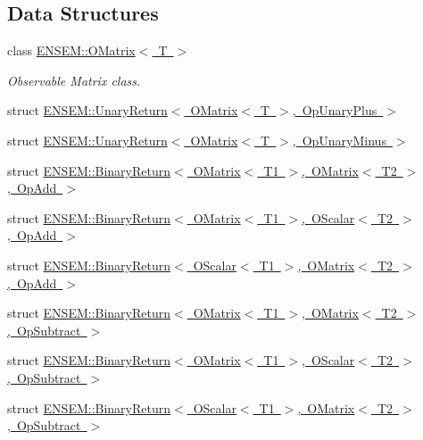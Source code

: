 \subsection*{Data Structures}
\begin{DoxyCompactItemize}
\item 
class \mbox{\hyperlink{classENSEM_1_1OMatrix}{E\+N\+S\+E\+M\+::\+O\+Matrix$<$ T $>$}}
\begin{DoxyCompactList}\small\item\em Observable Matrix class. \end{DoxyCompactList}\item 
struct \mbox{\hyperlink{structENSEM_1_1UnaryReturn_3_01OMatrix_3_01T_01_4_00_01OpUnaryPlus_01_4}{E\+N\+S\+E\+M\+::\+Unary\+Return$<$ O\+Matrix$<$ T $>$, Op\+Unary\+Plus $>$}}
\item 
struct \mbox{\hyperlink{structENSEM_1_1UnaryReturn_3_01OMatrix_3_01T_01_4_00_01OpUnaryMinus_01_4}{E\+N\+S\+E\+M\+::\+Unary\+Return$<$ O\+Matrix$<$ T $>$, Op\+Unary\+Minus $>$}}
\item 
struct \mbox{\hyperlink{structENSEM_1_1BinaryReturn_3_01OMatrix_3_01T1_01_4_00_01OMatrix_3_01T2_01_4_00_01OpAdd_01_4}{E\+N\+S\+E\+M\+::\+Binary\+Return$<$ O\+Matrix$<$ T1 $>$, O\+Matrix$<$ T2 $>$, Op\+Add $>$}}
\item 
struct \mbox{\hyperlink{structENSEM_1_1BinaryReturn_3_01OMatrix_3_01T1_01_4_00_01OScalar_3_01T2_01_4_00_01OpAdd_01_4}{E\+N\+S\+E\+M\+::\+Binary\+Return$<$ O\+Matrix$<$ T1 $>$, O\+Scalar$<$ T2 $>$, Op\+Add $>$}}
\item 
struct \mbox{\hyperlink{structENSEM_1_1BinaryReturn_3_01OScalar_3_01T1_01_4_00_01OMatrix_3_01T2_01_4_00_01OpAdd_01_4}{E\+N\+S\+E\+M\+::\+Binary\+Return$<$ O\+Scalar$<$ T1 $>$, O\+Matrix$<$ T2 $>$, Op\+Add $>$}}
\item 
struct \mbox{\hyperlink{structENSEM_1_1BinaryReturn_3_01OMatrix_3_01T1_01_4_00_01OMatrix_3_01T2_01_4_00_01OpSubtract_01_4}{E\+N\+S\+E\+M\+::\+Binary\+Return$<$ O\+Matrix$<$ T1 $>$, O\+Matrix$<$ T2 $>$, Op\+Subtract $>$}}
\item 
struct \mbox{\hyperlink{structENSEM_1_1BinaryReturn_3_01OMatrix_3_01T1_01_4_00_01OScalar_3_01T2_01_4_00_01OpSubtract_01_4}{E\+N\+S\+E\+M\+::\+Binary\+Return$<$ O\+Matrix$<$ T1 $>$, O\+Scalar$<$ T2 $>$, Op\+Subtract $>$}}
\item 
struct \mbox{\hyperlink{structENSEM_1_1BinaryReturn_3_01OScalar_3_01T1_01_4_00_01OMatrix_3_01T2_01_4_00_01OpSubtract_01_4}{E\+N\+S\+E\+M\+::\+Binary\+Return$<$ O\+Scalar$<$ T1 $>$, O\+Matrix$<$ T2 $>$, Op\+Subtract $>$}}

\end{DoxyCompactItemize}
